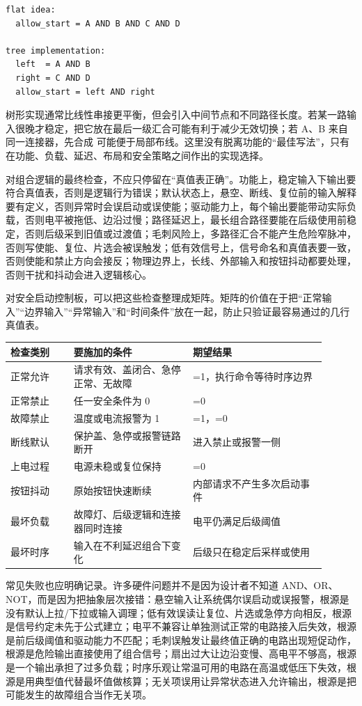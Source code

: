 \begin{lstlisting}
flat idea:
  allow_start = A AND B AND C AND D

tree implementation:
  left  = A AND B
  right = C AND D
  allow_start = left AND right
\end{lstlisting}

树形实现通常比线性串接更平衡，但会引入中间节点和不同路径长度。若某一路输入很晚才稳定，把它放在最后一级汇合可能有利于减少无效切换；若 A、B 来自同一连接器，先合成  可能便于局部布线。这里没有脱离功能的“最佳写法”，只有在功能、负载、延迟、布局和安全策略之间作出的实现选择。

对组合逻辑的最终检查，不应只停留在“真值表正确”。功能上，稳定输入下输出要符合真值表，否则是逻辑行为错误；默认状态上，悬空、断线、复位前的输入解释要有定义，否则异常时会误启动或误使能；驱动能力上，每个输出要能带动实际负载，否则电平被拖低、边沿过慢；路径延迟上，最长组合路径要能在后级使用前稳定，否则后级采到旧值或过渡值；毛刺风险上，多路径汇合不能产生危险窄脉冲，否则写使能、复位、片选会被误触发；低有效信号上，信号命名和真值表要一致，否则使能和禁止方向会接反；物理边界上，长线、外部输入和按钮抖动都要处理，否则干扰和抖动会进入逻辑核心。

对安全启动控制板，可以把这些检查整理成矩阵。矩阵的价值在于把“正常输入”“边界输入”“异常输入”和“时间条件”放在一起，防止只验证最容易通过的几行真值表。

\begin{longtable}{L{0.18\linewidth}L{0.34\linewidth}L{0.38\linewidth}}
\toprule
检查类别 & 要施加的条件 & 期望结果 \\
\midrule
正常允许 & 请求有效、盖闭合、急停正常、无故障 & =1，执行命令等待时序边界 \\
正常禁止 & 任一安全条件为 0 & =0 \\
故障禁止 & 温度或电流报警为 1 & =1，=0 \\
断线默认 & 保护盖、急停或报警链路断开 & 进入禁止或报警一侧 \\
上电过程 & 电源未稳或复位保持 & =0 \\
按钮抖动 & 原始按钮快速断续 & 内部请求不产生多次启动事件 \\
最坏负载 & 故障灯、后级逻辑和连接器同时连接 & 电平仍满足后级阈值 \\
最坏时序 & 输入在不利延迟组合下变化 & 后级只在稳定后采样或使用 \\
\bottomrule
\end{longtable}

常见失败也应明确记录。许多硬件问题并不是因为设计者不知道 AND、OR、NOT，而是因为把抽象层次接错：悬空输入让系统偶尔误启动或误报警，根源是没有默认上拉/下拉或输入调理；低有效误读让复位、片选或急停方向相反，根源是信号约定未先于公式建立；电平不兼容让单独测试正常的电路接入后失效，根源是前后级阈值和驱动能力不匹配；毛刺误触发让最终值正确的电路出现短促动作，根源是危险输出直接使用了组合信号；扇出过大让边沿变慢、高电平不够高，根源是一个输出承担了过多负载；时序乐观让常温可用的电路在高温或低压下失效，根源是用典型值代替最坏值做核算；无关项误用让异常状态进入允许输出，根源是把可能发生的故障组合当作无关项。

